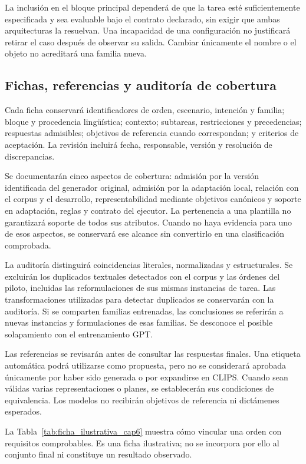 La inclusión en el bloque principal dependerá de que la tarea esté
suficientemente especificada y sea evaluable bajo el contrato declarado,
sin exigir que ambas arquitecturas la resuelvan. Una incapacidad de una
configuración no justificará retirar el caso después de observar su salida.
Cambiar únicamente el nombre o el objeto no acreditará una familia nueva.

\subsection{Fichas, referencias y auditoría de cobertura}

Cada ficha conservará identificadores de orden, escenario, intención y
familia; bloque y procedencia lingüística; contexto; subtareas,
restricciones y precedencias; respuestas admisibles; objetivos de referencia
cuando correspondan; y criterios de aceptación. La revisión incluirá fecha,
responsable, versión y resolución de discrepancias.

Se documentarán cinco aspectos de cobertura: admisión por la versión
identificada del generador original, admisión por la adaptación local,
relación con el corpus y el desarrollo, representabilidad mediante objetivos
canónicos y soporte en adaptación, reglas y contrato del ejecutor.
La pertenencia a una plantilla no garantizará soporte de todos sus atributos.
Cuando no haya evidencia para uno de esos aspectos, se conservará ese
alcance sin convertirlo en una clasificación comprobada.

La auditoría distinguirá coincidencias literales, normalizadas y
estructurales. Se excluirán los duplicados textuales detectados con el corpus y las
órdenes del piloto, incluidas las reformulaciones de sus mismas instancias
de tarea. Las transformaciones utilizadas para detectar duplicados se
conservarán con la auditoría. Si se comparten familias entrenadas,
las conclusiones se referirán a nuevas instancias y formulaciones de esas
familias. Se desconoce el posible solapamiento con el entrenamiento GPT.

Las referencias se revisarán antes de consultar las respuestas finales.
Una etiqueta automática podrá utilizarse como propuesta, pero no se
considerará aprobada únicamente por haber sido generada o por expandirse
en CLIPS. Cuando sean válidas varias representaciones o planes, se
establecerán sus condiciones de equivalencia. Los modelos no recibirán
objetivos de referencia ni dictámenes esperados.

La Tabla~\ref{tab:ficha_ilustrativa_cap6} muestra cómo vincular una orden
con requisitos comprobables. Es una ficha ilustrativa; no se incorpora
por ello al conjunto final ni constituye un resultado observado.

